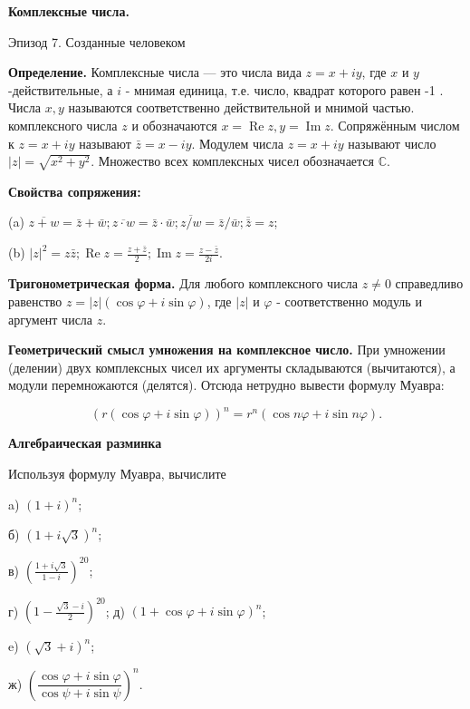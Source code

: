 \centerline{\bf \Huge Комплексные числа. }

\begin{flushright}
        \scriptsize{Эпизод 7. Созданные человеком}
\end{flushright}

\textbf{Определение.} Комплексные числа --- это числа вида $z=x+i y$, где $x$ и $y$-действительные, а $i$ - мнимая единица, т.е. число, квадрат которого равен -1 . Числа $x, y$ называются соответственно действительной и мнимой частью. комплексного числа $z$ и обозначаются $x=\operatorname{Re} z, y=\operatorname{Im} z$. Сопряжённым числом к $z=x+i y$ называют $\bar{z}=x-i y$. Модулем числа $z=x+i y$ называют число $|z|=\sqrt{x^2+y^2}$. Множество всех комплексных чисел обозначается $\mathbb{C}$.

\textbf{Свойства сопряжения:}

(a) $\overline{z+w}=\bar{z}+\bar{w} ; \overline{z \cdot w}=\bar{z} \cdot \bar{w} ; \overline{z / w}=\bar{z} / \bar{w} ; \overline{\bar{z}}=z$;

(b) $|z|^2=z \bar{z} ; \operatorname{Re} z=\frac{z+\bar{z}}{2} ; \operatorname{Im} z=\frac{z-\bar{z}}{2 i}$.

\textbf{Тригонометрическая форма.}
Для любого комплексного числа $z \neq 0$ справедливо равенство $z=|z|(\cos \varphi+i \sin \varphi)$, где $|z|$ и $\varphi$ - соответственно модуль и аргумент числа $z$.

\textbf{Геометрический смысл умножения на комплексное число.}
При умножении (делении) двух комплексных чисел их аргументы складываются (вычитаются), а модули перемножаются (делятся). Отсюда нетрудно вывести формулу Муавра:

$$
(r(\cos \varphi+i \sin \varphi))^n=r^n(\cos n \varphi+i \sin n \varphi) .
$$

\newpage

\hspace{3mm}

\textbf{\Large Алгебраическая разминка}

Используя формулу Муавра, вычислите

a) $(1+i)^n$;

б) $(1+i \sqrt{3})^n$;

в) $\left(\frac{1+i \sqrt{3}}{1-i}\right)^{20}$;

г) $\left(1-\frac{\sqrt{3}-i}{2}\right)^{20}$; д) $(1+\cos \varphi+i \sin\varphi)^n$;

e) $(\sqrt{3}+i)^n$;

ж) $\left(\dfrac{\cos \varphi+i \sin \varphi}{\cos \psi+i \sin \psi}\right)^n$.

